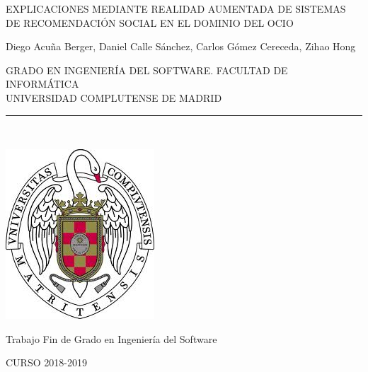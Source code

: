 \begin{center}

   \vspace{1cm}


   {\Large EXPLICACIONES MEDIANTE REALIDAD AUMENTADA DE SISTEMAS DE RECOMENDACIÓN SOCIAL EN EL DOMINIO DEL OCIO}\\

   \vspace{0.5cm}



   \vspace{0.5cm}



    Diego Acuña Berger, Daniel Calle Sánchez, Carlos Gómez Cereceda, Zihao Hong\\

   \vspace{0.5cm}




   GRADO EN INGENIERÍA DEL SOFTWARE. FACULTAD DE INFORMÁTICA\\
   UNIVERSIDAD COMPLUTENSE DE MADRID \\


   \vspace{0.65cm}
   \rule{2in}{0.5pt}\\
   \vspace{0.85cm}

  \includegraphics[height=2.5in]{figures/escudo.jpg}
  

   \vspace{0.5cm}
Trabajo Fin de Grado en Ingeniería del Software

   \vspace{0.5cm}







  CURSO 2018-2019
   \vspace{1cm}

\end{center}

